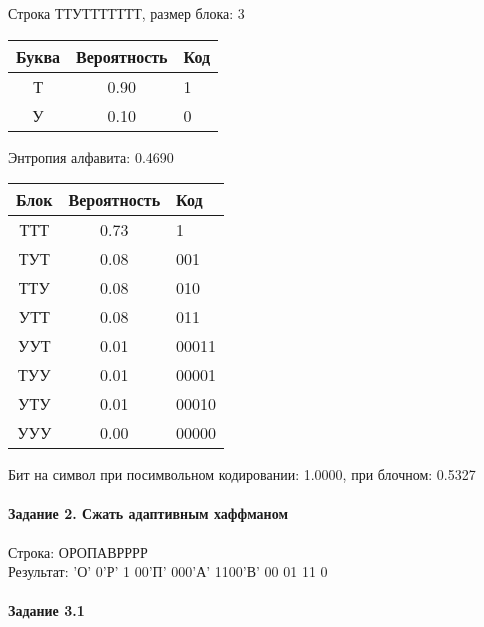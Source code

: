 \documentclass[a4paper, 12pt]{article}
\begin{document}
Строка ТТУТТТТТТТ, размер блока: 3
\begin{center}
 \begin{tabular}{ |c|c|l| } 
  \hline
     Буква & Вероятность & Код\\ \hline
Т & 0.90 & 1\\\hline
У & 0.10 & 0
\\ \hline \end{tabular}
\end{center}
Энтропия алфавита: 0.4690
\begin{center}
 \begin{tabular}{ |c|c|l| } 
  \hline
     Блок & Вероятность & Код\\ \hline
ТТТ & 0.73 & 1\\\hline
ТУТ & 0.08 & 001\\\hline
ТТУ & 0.08 & 010\\\hline
УТТ & 0.08 & 011\\\hline
УУТ & 0.01 & 00011\\\hline
ТУУ & 0.01 & 00001\\\hline
УТУ & 0.01 & 00010\\\hline
УУУ & 0.00 & 00000
\\ \hline \end{tabular}
\end{center}
Бит на символ при посимвольном кодировании: 1.0000, при блочном: 0.5327


\pagebreak
\paragraph{Задание 2. Сжать адаптивным хаффманом\\}

Строка: 
ОРОПАВРРРР\\
Результат: 'О' 0'Р' 1 00'П' 000'А' 1100'В' 00 01 11 0










\pagebreak
\paragraph{Задание 3.1}
\end{document}
